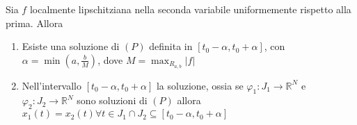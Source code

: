 \begin{theorem}
Sia \(f\) localmente lipschitziana nella seconda variabile uniformemente
rispetto alla prima. Allora
\begin{enumerate}[label = \alph*)]
    \item Esiste una soluzione di \((P)\) definita in \([t_{0} - \alpha, t_{0} +
        \alpha]\), con \(\alpha = \min\left(a, \frac{b}{M}\right)\), dove \(M = \max_{R_{a,
        b}}|f| \) 
    \item Nell'intervallo \([t_{0} - \alpha, t_{0} + \alpha]\) la soluzione,
        ossia se \(\varphi_{1} : J_{1} \to \mathbb{R}^{N}\) e \(\varphi_{2} :
        J_{2} \to \mathbb{R}^{N}\) sono soluzioni di \((P)\) allora
        \(x_{1}(t) = x_{2}(t) \forall t \in J_{1} \cap J_{2} \subseteq [t_{0} -
        \alpha, t_{0} + \alpha]\) 
\end{enumerate}
\end{theorem}
